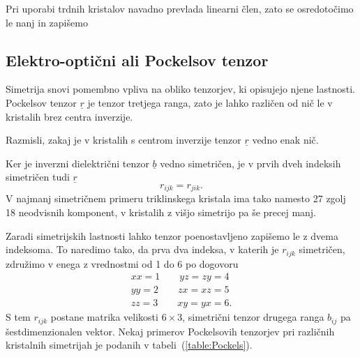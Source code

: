 Pri uporabi trdnih kristalov navadno prevlada linearni člen, zato se osredotočimo
le nanj in zapišemo

\subsection*{Elektro-optični ali Pockelsov tenzor}
Simetrija snovi pomembno vpliva na obliko tenzorjev, ki opisujejo njene lastnosti.
Pockelsov tenzor $\underline{r}$ je tenzor tretjega ranga, zato je lahko različen
od nič le v kristalih brez centra inverzije. 
\begin{definition}
Razmisli, zakaj je v kristalih s centrom inverzije tenzor $\underline{r}$
vedno enak nič. 
\end{definition}

Ker je inverzni dielektrični tenzor $\underline{b}$ vedno simetričen, je v 
prvih dveh indeksih simetričen tudi $\underline{r}$
\begin{equation}
r_{ijk} = r_{jik}.
\end{equation}
V najmanj simetričnem primeru triklinskega kristala ima tako namesto 27 zgolj 
18 neodvisnih komponent, v kristalih z višjo simetrijo pa še precej manj. 

Zaradi simetrijskih lastnosti lahko tenzor poenostavljeno zapišemo le z dvema
indeksoma. To naredimo tako, da prva dva indeksa, v katerih je $r_{ijk}$ simetričen, združimo
v enega z vrednostmi od 1 do 6 po dogovoru 
\begin{eqnarray}
 xx=1 \qquad  yz=zy = 4 \\
 yy=2 \qquad  zx=xz = 5 \\
 zz=3 \qquad  xy=yx = 6.
\end{eqnarray}
S tem $r_{ijk}$ postane matrika velikosti $6\times3$, simetrični tenzor drugega 
ranga $b_{ij}$ pa šestdimenzionalen vektor.
Nekaj primerov Pockelsovih tenzorjev pri različnih kristalnih simetrijah
je podanih v tabeli~(\ref{table:Pockels}).

